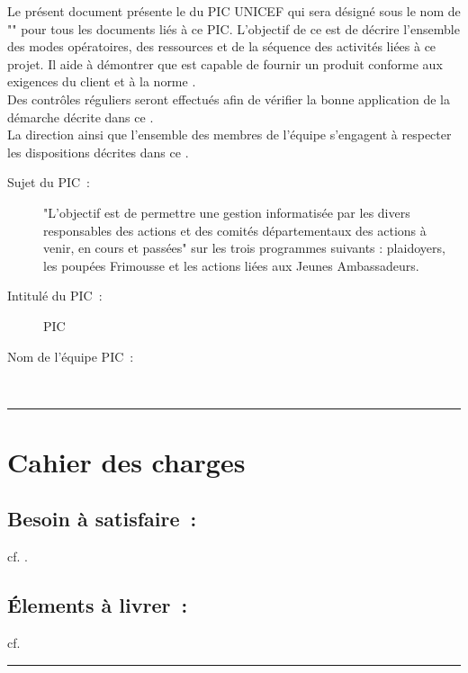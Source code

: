 		Le présent document présente le \PQ{} du PIC UNICEF qui sera désigné sous le nom de "\nomEquipe" pour tous les documents liés à ce PIC. L'objectif de ce \PQ{} est de décrire l'ensemble des modes opératoires, des ressources et de la séquence des activités liées à ce projet. Il aide à démontrer que \nomEquipe{} est capable de fournir un produit conforme aux exigences du client et à la norme \ISO . \\
		
		Des contrôles réguliers seront effectués afin de vérifier la bonne application de la démarche décrite dans ce \PQ .\\
		
		La direction ainsi que l'ensemble des membres de l'équipe \nomEquipe{} s'engagent à respecter les dispositions décrites dans ce \PQ .\\ 
		

		
	\begin{description}
		\item[Sujet du PIC~:] "L'objectif est de permettre une gestion informatisée par les divers responsables des actions et des comités départementaux des actions à venir, en cours et passées" sur les trois programmes suivants : plaidoyers, les poupées Frimousse et les actions liées aux Jeunes Ambassadeurs. \\	
		\item[Intitulé du PIC~:] PIC \nomPIC \\	
		\item[Nom de l'équipe PIC~:] \nomEquipe \\
	\end{description}


\noindent\hfil\rule{\textwidth}{.4pt}\hfil


		
\section*{Cahier des charges}
		\subsection*{Besoin à satisfaire~:} 
			cf. \DSE . 		
		\subsection*{Élements à livrer~:}
			cf. \DSE
			
					


	\vspace{1cm}
	\noindent\hfil\rule{\textwidth}{.4pt}\hfil
	\vspace{1cm}	
	
